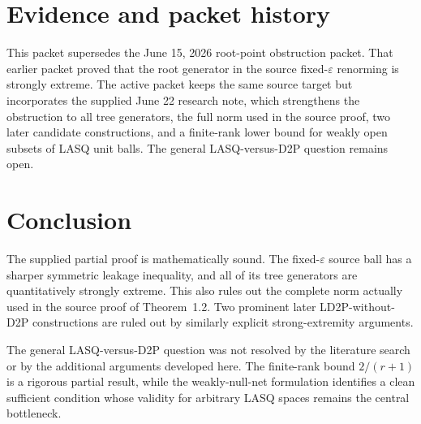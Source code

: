 \documentclass[11pt]{article}
\newcommand{\eps}{\varepsilon}
\begin{document}
\section{Evidence and packet history}

This packet supersedes the June 15, 2026 root-point obstruction packet.  That
earlier packet proved that the root generator in the source fixed-$\eps$
renorming is strongly extreme.  The active packet keeps the same source target
but incorporates the supplied June 22 research note, which strengthens the
obstruction to all tree generators, the full norm used in the source proof, two
later candidate constructions, and a finite-rank lower bound for weakly open
subsets of LASQ unit balls.  The general LASQ-versus-D2P question remains open.

\section{Conclusion}

The supplied partial proof is mathematically sound.  The fixed-$\eps$ source ball has a sharper symmetric leakage inequality, and all of its tree generators are quantitatively strongly extreme.  This also rules out the complete norm actually used in the source proof of Theorem~1.2.  Two prominent later LD2P-without-D2P constructions are ruled out by similarly explicit strong-extremity arguments.

The general LASQ-versus-D2P question was not resolved by the literature search or by the additional arguments developed here.  The finite-rank bound $2/(r+1)$ is a rigorous partial result, while the weakly-null-net formulation identifies a clean sufficient condition whose validity for arbitrary LASQ spaces remains the central bottleneck.
\end{document}
